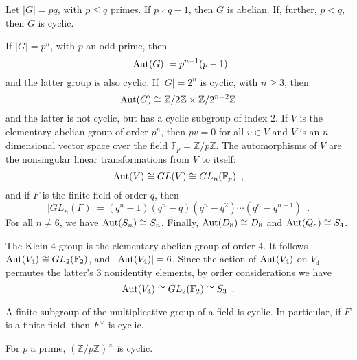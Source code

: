 \begin{corollary} \cite[136]{DummitFoote2004} Let $|G| = pq$, with $p \leq q$ primes. If $p \nmid q - 1$, then $G$ is abelian. If, further, $p < q$, then $G$ is cyclic.
\end{corollary}

\begin{proposition} \cite[136]{DummitFoote2004} If $|G| = p^n$, with $p$ an odd prime, then
$$
|\operatorname{Aut}(G)| = p^{n - 1} (p - 1)
$$
and the latter group is also cyclic. If $|G| = 2^n$ is cyclic, with $n \geq 3$, then
$$
\operatorname{Aut}(G) \cong \mathbb{Z} / 2 \mathbb{Z} \times \mathbb{Z} / 2^{n - 2} \mathbb{Z}
$$
and the latter is not cyclic, but has a cyclic subgroup of index 2. If $V$ is the elementary abelian group of order $p^n$, then $pv = 0$ for all $v \in V$ and $V$ is an $n$-dimensional vector space over the field $\mathbb{F}_p = \mathbb{Z} / p \mathbb{Z}$. The automorphisms of $V$ are the nonsingular linear transformations from $V$ to itself:
$$
\operatorname{Aut}(V) \cong GL(V) \cong GL_n(\mathbb{F}_p) \enspace,
$$
and if $F$ is the finite field of order $q$, then
$$
|GL_n(F)| = (q^n - 1) (q^n - q) (q^n - q^2) \cdots (q^n - q^{n - 1}) \enspace.
$$
For all $n \ne 6$, we have $\operatorname{Aut}(S_n) \cong S_n$. Finally, $\operatorname{Aut}(D_8) \cong D_8$ and $\operatorname{Aut}(Q_8) \cong S_4$.
\end{proposition}

\begin{example} \cite[137]{DummitFoote2004} The Klein 4-group is the elementary abelian group of order 4. It follows $\operatorname{Aut}(V_4) \cong GL_2(\mathbb{F}_2)$, and $|\operatorname{Aut}(V_4)| = 6$. Since the action of $\operatorname{Aut}(V_4)$ on $V_4$ permutes the latter's 3 nonidentity elements, by order considerations we have
$$
\operatorname{Aut}(V_4) \cong GL_2(\mathbb{F}_2) \cong S_3 \enspace.
$$
\end{example}

\begin{proposition} \cite[314]{DummitFoote2004} A finite subgroup of the multiplicative group of a field is cyclic. In particular, if $F$ is a finite field, then $F^\times$ is cyclic.
\end{proposition}

\begin{corollary} \cite[314]{DummitFoote2004} For $p$ a prime, $(\mathbb{Z} / p \mathbb{Z})^\times$ is cyclic.
\end{corollary}
